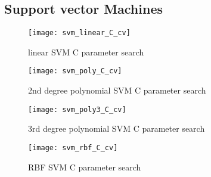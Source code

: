 
\subsection{Support vector Machines}%
\label{sub:svm}


\begin{figure}[H]
    \centering
    \texttt{[image: svm\_linear\_C\_cv]}
    \caption{linear SVM C parameter search}%
    \label{fig:svm_linear_C_cv}
\end{figure}

\begin{figure}[H]
    \centering
    \texttt{[image: svm\_poly\_C\_cv]}
    \caption{2nd degree polynomial SVM C parameter search}%
    \label{fig:svm_poly_C_cv}
\end{figure}

\begin{figure}[H]
    \centering
    \texttt{[image: svm\_poly3\_C\_cv]}
    \caption{3rd degree polynomial SVM C parameter search}%
    \label{fig:svm_poly3_C_cv}
\end{figure}

\begin{figure}[H]
    \centering
    \texttt{[image: svm\_rbf\_C\_cv]}
    \caption{RBF SVM C parameter search}%
    \label{fig:svm_rbf_C_cv}
\end{figure}
